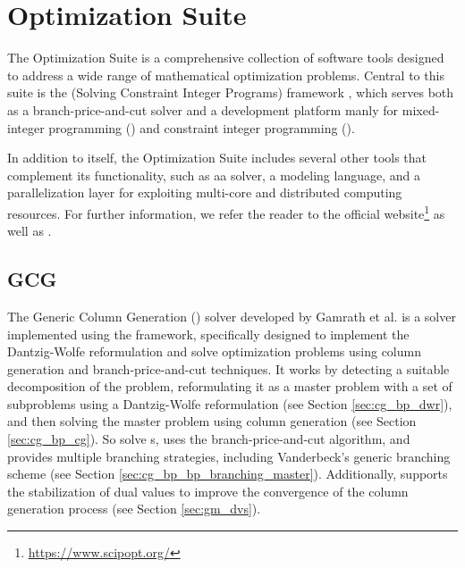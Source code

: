 \chapter{\SCIP{} Optimization Suite}\label{ch:tools}
The \SCIP{} Optimization Suite is a comprehensive collection of software tools designed to address a wide range of mathematical optimization problems. Central to this suite is the \SCIP{} (Solving Constraint Integer Programs) framework \cite{achterberg2007constraint, achterberg2009scip}, which serves both as a branch-price-and-cut solver and a development platform manly for mixed-integer programming (\MIP{}) and constraint integer programming (\CIP{}).

In addition to \SCIP{} itself, the \SCIP{} Optimization Suite includes several other tools that complement its functionality, such as aa \LP{} solver, a modeling language, and a parallelization layer for exploiting multi-core and distributed computing resources. For further information, we refer the reader to the official \SCIP{} website\footnote{\url{https://www.scipopt.org/}} as well as \cite{bolusani2024scip}.

\section{GCG}\label{sec:tools_gcg}
The Generic Column Generation (\GCG{}) solver developed by Gamrath et al. \cite{gamrath2010generic} is a solver implemented using the \SCIP{} framework, specifically designed to implement the Dantzig-Wolfe reformulation and solve optimization problems using column generation and branch-price-and-cut techniques. It works by detecting a suitable decomposition of the problem, reformulating it as a master problem with a set of subproblems using a Dantzig-Wolfe reformulation (see Section \ref{sec:cg_bp_dwr}), and then solving the master problem using column generation (see Section \ref{sec:cg_bp_cg}). So solve \MIP{}s, \GCG{} uses the branch-price-and-cut algorithm, and provides multiple branching strategies, including Vanderbeck's generic branching scheme (see Section \ref{sec:cg_bp_bp_branching_master}). Additionally, \GCG{} supports the stabilization of dual values to improve the convergence of the column generation process (see Section \ref{sec:gm_dvs}).
